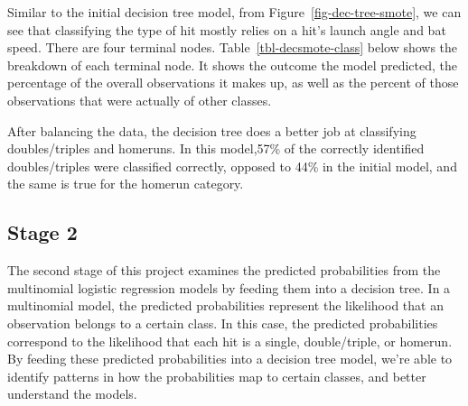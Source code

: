 \documentclass[
  letterpaper,
  DIV=11,
  numbers=noendperiod]{scrartcl}
\begin{document}
Similar to the initial decision tree model, from
Figure~\ref{fig-dec-tree-smote}, we can see that classifying the type of
hit mostly relies on a hit's launch angle and bat speed. There are four
terminal nodes. Table~\ref{tbl-decsmote-class} below shows the breakdown
of each terminal node. It shows the outcome the model predicted, the
percentage of the overall observations it makes up, as well as the
percent of those observations that were actually of other classes.

\begin{table}

\caption{\label{tbl-decsmote-class}Results of stage 1 decision tree
classification for the SMOTE model}


\end{table}%

After balancing the data, the decision tree does a better job at
classifying doubles/triples and homeruns. In this model,57\% of the
correctly identified doubles/triples were classified correctly, opposed
to 44\% in the initial model, and the same is true for the homerun
category.

\subsection{Stage 2}\label{stage-2}

The second stage of this project examines the predicted probabilities
from the multinomial logistic regression models by feeding them into a
decision tree. In a multinomial model, the predicted probabilities
represent the likelihood that an observation belongs to a certain class.
In this case, the predicted probabilities correspond to the likelihood
that each hit is a single, double/triple, or homerun. By feeding these
predicted probabilities into a decision tree model, we're able to
identify patterns in how the probabilities map to certain classes, and
better understand the models.
\end{document}
